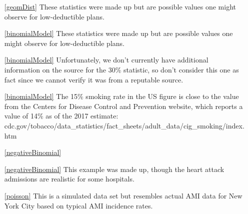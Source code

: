 \begin{itemize}
\item[\ref{geomDist}]
    These statistics were made up but are possible
    values one might observe for low-deductible plans.

\item[\ref{binomialModel}]
    These statistics were made up but are possible
    values one might observe for low-deductible plans.
\item[\ref{binomialModel}]
    Unfortunately, we don't currently have additional
    information on the source for the 30\% statistic,
    so don't consider this one as fact since we cannot
    verify it was from a reputable source.
\item[\ref{binomialModel}]
    The 15\% smoking rate in the US figure is close to
    the value from the Centers for Disease Control and
    Prevention website, which reports a value of 14\%
    as of the 2017 estimate: \\
        {cdc.gov/tobacco/data\_statistics/fact\_sheets/adult\_data/cig\_smoking/index.htm}

\item[\ref{negativeBinomial}]
    \madeup{}
\item[\ref{negativeBinomial}]
    This example was made up, though the heart attack
    admissions are realistic for some hospitals.

\item[\ref{poisson}]
    This is a simulated data set but resembles actual
    AMI data for New York City based on typical AMI
    incidence rates.
\end{itemize}








\section{}
\label{ch_foundations_for_inf_data}

